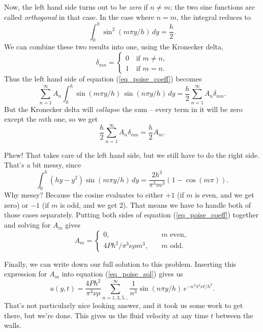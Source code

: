Now, the left hand side turns out to be \emph{zero} if $n \neq m$; the two sine functions are called \emph{orthogonal} in that case.  In the case where $n=m$, the integral reduces to
\[
\int_0^h \sin^2(m \pi y / h) \, dy = \frac{h}{2}.
\]
We can combine these two results into one, using the Kronecker delta,
\begin{equation}
\delta_{mn} = \begin{cases} 0 \quad \text{if } m \neq n, \\ 1 \quad \text{if } m = n. \end{cases}
\end{equation}
Thus the left hand side of equation (\ref{eq_poise_coeff}) becomes
\[
\sum_{n=1}^\infty A_n \int_0^h \sin(m\pi y/h) \, \sin(n \pi y / h) \, dy = \frac{h}{2} \sum_{n=1}^\infty A_n  \delta_{mn}.
\]
But the Kronecker delta will \emph{collapse} the sum -- every term in it will be zero except the $m$th one, so we get
\[
\frac{h}{2} \sum_{n=1}^\infty A_n  \delta_{mn} = \frac{h}{2} A_m.
\]

Phew!  That takes care of the left hand side, but we still have to do the right side.  That's a bit messy, since 
\[
\int_0^h (hy - y^2) \sin(m\pi y / h)\, dy = \frac{2h^3}{\pi^3 m^3} \left( 1 - \cos(m\pi) \right).
\]
Why messy?  Because the cosine evaluates to either $+1$ (if $m$ is even, and we get zero) or $-1$ (if $m$ is odd, and we get $2$).  That means we have to handle both of those cases separately.  Putting both sides of equation (\ref{eq_poise_coeff}) together and solving for $A_m$ gives
\begin{equation}
A_m = \begin{cases}
       0, \quad & m \text{ even}, \\
       {4Ph^2}/{\pi^3 \nu \rho m^3}, \quad & m \text{ odd}.
\end{cases}
\end{equation}

Finally, we can write down our full solution to this problem.  Inserting this expression for $A_m$ into equation (\ref{eq_poise_sol}) gives us
\begin{equation}
\label{eq_poise_time_sol}
u(y, t) = \frac{4Ph^2}{\pi^3 \nu \rho} \sum_{n=1, 3, 5 \dots}^\infty \frac{1}{n^3} \sin(n \pi y / h) \, e^{-n^2 \pi^2 \nu t / h^2}.
\end{equation}
That's not particularly nice looking answer, and it took us some work to get there, but we're done.  This gives us the fluid velocity at any time $t$ between the walls.

